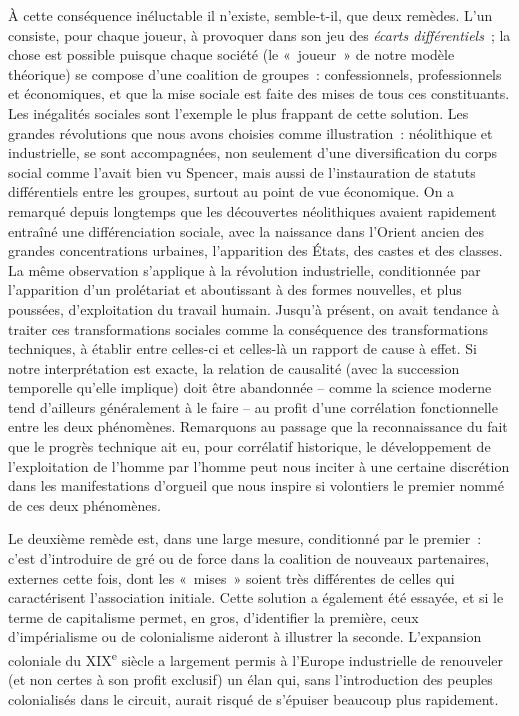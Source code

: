 \documentclass[french,twoside]{book} %
\begin{document}
À cette conséquence inéluctable il n’existe, semble-t-il, que deux remèdes. L’un consiste, pour chaque joueur, à provoquer dans son jeu des \emph{écarts différentiels} ; la chose est possible puisque chaque société (le « joueur » de notre modèle théorique) se compose d’une coalition de groupes : confessionnels, professionnels et économiques, et que la mise sociale est faite des mises de tous ces constituants. Les inégalités sociales sont l’exemple le plus frappant de cette solution. Les grandes révolutions que nous avons choisies comme illustration : néolithique et industrielle, se sont accompagnées, non seulement d’une diversification du corps social comme l’avait bien vu Spencer, mais aussi de l’instauration de statuts différentiels entre les groupes, surtout au point de vue économique. On a remarqué depuis longtemps que les découvertes néolithiques avaient rapidement entraîné une différenciation sociale, avec la naissance dans l’Orient ancien des grandes concentrations urbaines, l’apparition des États, des castes et des classes. La même observation s’applique à la révolution industrielle, conditionnée par l’apparition d’un prolétariat et aboutissant à des formes nouvelles, et plus poussées, d’exploitation du travail humain. Jusqu’à présent, on avait tendance à traiter ces transformations sociales comme la conséquence des transformations techniques, à établir entre celles-ci et celles-là un rapport de cause à effet. Si notre interprétation est exacte, la relation de causalité (avec la succession temporelle qu’elle implique) doit être abandonnée – comme la science moderne tend d’ailleurs généralement à le faire – au profit d’une corrélation fonctionnelle entre les deux phénomènes. Remarquons au passage que la reconnaissance du fait que le progrès technique ait eu, pour corrélatif historique, le développement de l’exploitation de l’homme par l’homme peut nous inciter à une certaine discrétion dans les manifestations d’orgueil que nous inspire si volontiers le premier nommé de ces deux phénomènes.\par
Le deuxième remède est, dans une large mesure, conditionné par le premier : c’est d’introduire de gré ou de force dans la coalition de nouveaux partenaires, externes cette fois, dont les « mises » soient très différentes de celles qui caractérisent l’association initiale. Cette solution a également été essayée, et si le terme de capitalisme permet, en gros, d’identifier la première, ceux d’impérialisme ou de colonialisme aideront à illustrer la seconde. L’expansion coloniale du XIX\textsuperscript{e} siècle a largement permis à l’Europe industrielle de renouveler (et non certes à son profit exclusif) un élan qui, sans l’introduction des peuples colonialisés dans le circuit, aurait risqué de s’épuiser beaucoup plus rapidement.\par
\end{document}
